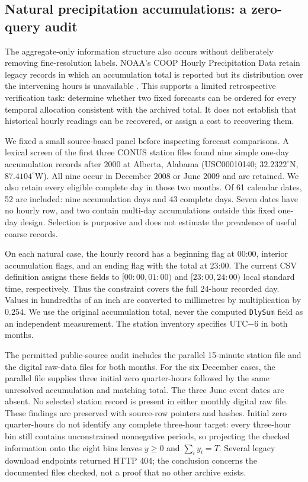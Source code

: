 \subsection{Natural precipitation accumulations: a zero-query audit}
\label{sec:noaa-natural}
The aggregate-only information structure also occurs without deliberately
removing fine-resolution labels. NOAA's COOP Hourly Precipitation Data retain
legacy records in which an accumulation total is reported but its distribution
over the intervening hours is unavailable \cite{noaa_hpd_v2,noaa_hpd_format}.
This supports a limited retrospective verification task: determine whether two
fixed forecasts can be ordered for every temporal allocation consistent with
the archived total. It does not establish that historical hourly readings can
be recovered, or assign a cost to recovering them.

We fixed a small source-based panel before inspecting forecast comparisons.
A lexical screen of the first three CONUS station files found nine simple
one-day accumulation records after 2000 at Alberta, Alabama
(USC00010140; $32.2322^{\circ}$N, $87.4104^{\circ}$W). All nine occur in December
2008 or June 2009 and are retained. We also retain every eligible complete day
in those two months. Of 61 calendar dates, 52 are included: nine accumulation
days and 43 complete days. Seven dates have no hourly row, and two contain
multi-day accumulations outside this fixed one-day design. Selection is
purposive and does not estimate the prevalence of useful coarse records.

On each natural case, the hourly record has a beginning flag at 00:00,
interior accumulation flags, and an ending flag with the total at 23:00.
The current CSV definition assigns these fields to $[00{:}00,01{:}00)$ and
$[23{:}00,24{:}00)$ local standard time, respectively. Thus the constraint
covers the full 24-hour recorded day. Values in hundredths of an inch are
converted to millimetres by multiplication by $0.254$. We use the original
accumulation total, never the computed \texttt{DlySum} field as an independent
measurement. The station inventory specifies UTC$-6$ in both months.

The permitted public-source audit includes the parallel 15-minute station
file and the digital raw-data files for both months. For the six December
cases, the parallel file supplies three initial zero quarter-hours followed
by the same unresolved accumulation and matching total. The three June
event dates are absent. No selected station record is present in either
monthly digital raw file. These findings are preserved with source-row
pointers and hashes. Initial zero quarter-hours do not identify any complete
three-hour target: every three-hour bin still contains unconstrained
nonnegative periods, so projecting the checked information onto the eight
bins leaves $y\geq0$ and $\sum_i y_i=T$. Several legacy download endpoints
returned HTTP 404; the conclusion concerns the documented files checked,
not a proof that no other archive exists.

